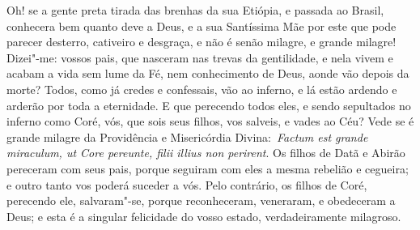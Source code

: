 Oh! se a gente preta tirada das brenhas da sua Etiópia, e
passada ao Brasil, conhecera bem quanto deve a Deus, e a sua Santíssima
Mãe por este que pode parecer desterro, cativeiro e desgraça, e não é
senão milagre, e grande milagre! Dizei"-me: vossos pais, que nasceram nas
trevas da gentilidade, e nela vivem e acabam a vida sem lume da Fé, nem
conhecimento de Deus, aonde vão depois da morte? Todos, como já credes e
confessais, vão ao inferno, e lá estão ardendo e arderão por toda a
eternidade. E que perecendo todos eles, e sendo sepultados no inferno
como Coré, vós, que sois seus filhos, vos salveis, e vades ao Céu? Vede
se é grande milagre da Providência e Misericórdia Divina:~\emph{Factum
est grande miraculum, ut Core pereunte, filii illius non perirent}. Os
filhos de Datã e Abirão pereceram com seus pais, porque seguiram com
eles a mesma rebelião e cegueira; e outro tanto vos poderá suceder a
vós. Pelo contrário, os filhos de Coré, perecendo ele, salvaram"-se,
porque reconheceram, veneraram, e obedeceram a Deus; e esta é a singular
felicidade do vosso estado, verdadeiramente milagroso.

